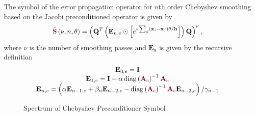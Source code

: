 \begin{definition}
The symbol of the error propagation operator for $n$th order Chebyshev smoothing based on the Jacobi preconditioned operator is given by
\begin{equation}
\tilde{{\color{burgundy}\mathbf{S}}} \left( \nu, n, \theta \right) = \left( \mathbf{Q}^T \left( \mathbf{E}_{n, e} \odot \left[ e^{\imath \sum_d \left( \mathbf{x}_i - \mathbf{x}_j \right) \mathbf{\theta} / \mathbf{h}} \right] \right) \mathbf{Q} \right)^\nu,
\end{equation}
where $\nu$ is the number of smoothing passes and $\mathbf{E}_n$ is given by the recursive definition
\begin{equation}
\begin{tabular}{c}
$\mathbf{E}_{0, e} = \mathbf{I}$\\
$\mathbf{E}_{1, e} = \mathbf{I} - \alpha \diag \left( {\color{burgundy}\mathbf{A}}_e \right)^{-1} {\color{burgundy}\mathbf{A}}_e$\\
$\mathbf{E}_{n, e} = \left( \alpha \mathbf{E}_{n - 1, e} + \beta_n \mathbf{E}_{n - 2, e} - \diag \left( {\color{burgundy}\mathbf{A}}_e \right)^{-1} {\color{burgundy}\mathbf{A}}_e \mathbf{E}_{n - 2, e} \right) / \gamma_{n - 1}$
\end{tabular}
\end{equation}
\label{def:chebyshev_symbol}
\end{definition}

\begin{figure}[!ht]
  \centering
  \hfill
  \caption{Spectrum of Chebyshev Preconditioner Symbol}
\end{figure}

